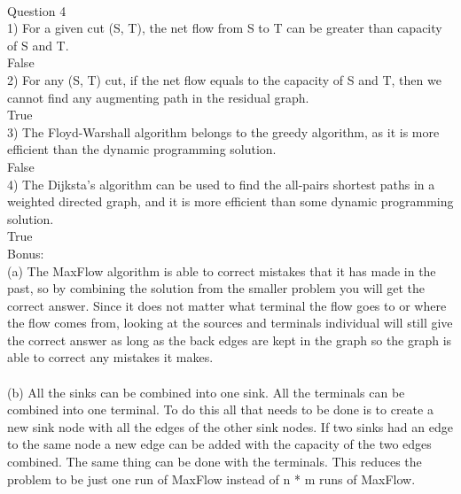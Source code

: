 \documentclass{article}
\begin{document}
\\



Question 4\\
1) For a given cut (S, T), the net flow from S to T can be greater than capacity of S and T.\\
False\\
2) For any (S, T) cut, if the net flow equals to the capacity of S and T, then we cannot find any augmenting path in the residual graph.\\
True\\
3) The Floyd-Warshall algorithm belongs to the greedy algorithm, as it is more efficient than the dynamic programming solution.\\
False\\
4) The Dijksta's algorithm can be used to find the all-pairs shortest paths in a weighted directed graph, and it is more efficient than some dynamic programming solution.\\
True\\

Bonus:\\
(a) The MaxFlow algorithm is able to correct mistakes that it has made in the past, so by combining the solution from the smaller problem you will get the correct answer.
Since it does not matter what terminal the flow goes to or where the flow comes from, looking at the sources and terminals individual will still give the correct answer as long as the back edges are kept in the graph so the graph is able to correct any mistakes it makes. 
\\
\\
(b) All the sinks can be combined into one sink. 
All the terminals can be combined into one terminal. 
To do this all that needs to be done is to create a new sink node with all the edges of the other sink nodes.
If two sinks had an edge to the same node a new edge can be added with the capacity of the two edges combined.
The same thing can be done with the terminals. 
This reduces the problem to be just one run of MaxFlow instead of n * m runs of MaxFlow.
\end{document}
